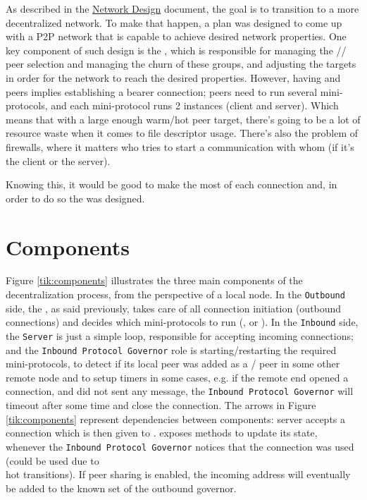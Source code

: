 As described in the \href{https://ouroboros-network.cardano.intersectmbo.org/pdfs/network-design}{Network Design} document, the goal is to transition to a more
decentralized network. To make that happen, a plan was designed to come up with a P2P
network that is capable to achieve desired network properties. One key component of
such design is the \ptopgov{}, which is responsible for managing the \cold{}/\warm{}/\hot{}
peer selection and managing the churn of these groups, and adjusting the targets in order for
the network to reach the desired properties. However, having \warm{} and \hot{} peers implies
establishing a bearer connection; \hot{} peers need to run several mini-protocols, and each
mini-protocol runs 2 instances (client and server). Which means that with a large enough
warm/hot peer target, there's going to be a lot of resource waste when it comes to file
descriptor usage. There's also the problem of firewalls, where it matters who tries to
start a communication with whom (if it's the client or the server).

Knowing this, it would be good to make the most of each connection and, in order to do so the
\Connmngr{} was designed.

\section{Components}
Figure \ref{tik:components} illustrates the three main components of the decentralization
process, from the perspective of a local node. In the \texttt{Outbound} side, the
\ptopgov{}, as said previously, takes care of all connection initiation (outbound
connections) and decides which mini-protocols to run (\established{}, \warm{} or \hot{}).
In the \texttt{Inbound} side, the \texttt{Server} is just a simple loop, responsible for accepting incoming
connections; and the \texttt{Inbound Protocol Governor} role is starting/restarting the required
mini-protocols, to detect if its local peer was added as a \warm{}/\hot{}
peer in some other remote node and to setup timers in some cases, e.g. if the
remote end opened a connection, and did not sent any message, the
\texttt{Inbound Protocol Governor} will timeout after some time and close the
connection. The arrows in Figure \ref{tik:components} represent dependencies
between components: server accepts a connection which is then given to
\Connmngr{}. \Connmngr{} exposes methods to update its state, whenever the
\texttt{Inbound Protocol Governor} notices that the connection was used (could
be used due to \warm{}\\hot{} transitions).  If peer sharing is enabled, the
incoming address will eventually be added to the known set of the outbound
governor.

